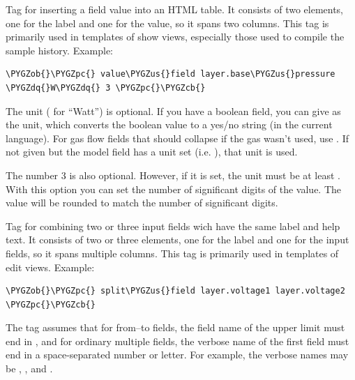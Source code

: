 \documentclass[a4paper,11pt,english]{sphinxmanual}
\def\PYGZus{\char`\_}
\def\PYGZob{\char`\{}
\def\PYGZcb{\char`\}}
\def\PYGZpc{\char`\%}
\def\PYGZdq{\char`\"}
\begin{document}
\begin{fulllineitems}
\label{programming/template_tags_and_filters:samples.templatetags.samples_extras.value_field}
Tag for inserting a field value into an HTML table.  It consists of two
 elements, one for the label and one for the value, so it spans two
columns.  This tag is primarily used in templates of show views, especially
those used to compile the sample history.  Example:

\begin{Verbatim}[commandchars=\\\{\},formatcom=\scriptsize]
\PYGZob{}\PYGZpc{} value\PYGZus{}field layer.base\PYGZus{}pressure \PYGZdq{}W\PYGZdq{} 3 \PYGZpc{}\PYGZcb{}
\end{Verbatim}

The unit ( for “Watt”) is optional.  If you have a boolean field,
you can give  as the unit, which converts the boolean value to
a yes/no string (in the current language).  For gas flow fields that should
collapse if the gas wasn't used, use .  If not given but
the model field has a unit set (i.e. ), that unit is
used.

The number 3 is also optional.  However, if it is set, the unit must be at
least .  With this option you can set the number of significant
digits of the value.  The value will be rounded to match the number of
significant digits.

\end{fulllineitems}


\begin{fulllineitems}
\label{programming/template_tags_and_filters:samples.templatetags.samples_extras.split_field}
Tag for combining two or three input fields wich have the same label
and help text.  It consists of two or three  elements, one for the
label and one for the input fields, so it spans multiple columns.  This tag
is primarily used in templates of edit views.  Example:

\begin{Verbatim}[commandchars=\\\{\},formatcom=\scriptsize]
\PYGZob{}\PYGZpc{} split\PYGZus{}field layer.voltage1 layer.voltage2 \PYGZpc{}\PYGZcb{}
\end{Verbatim}

The tag assumes that for from–to fields, the field name of the upper limit
must end in , and for ordinary multiple fields, the verbose name
of the first field must end in a space-separated number or letter.  For
example, the verbose names may be , , and
.

\end{fulllineitems}
\end{document}
